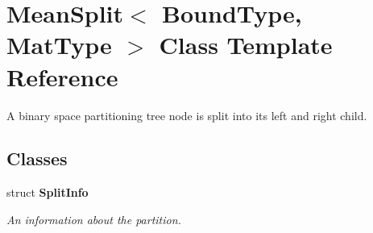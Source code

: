 \section{Mean\+Split$<$ Bound\+Type, Mat\+Type $>$ Class Template Reference}
\label{classmlpack_1_1tree_1_1MeanSplit}


A binary space partitioning tree node is split into its left and right child.  


\subsection*{Classes}
\begin{DoxyCompactItemize}
\item 
struct \textbf{ Split\+Info}
\begin{DoxyCompactList}\small\item\em An information about the partition. \end{DoxyCompactList}\end{DoxyCompactItemize}
